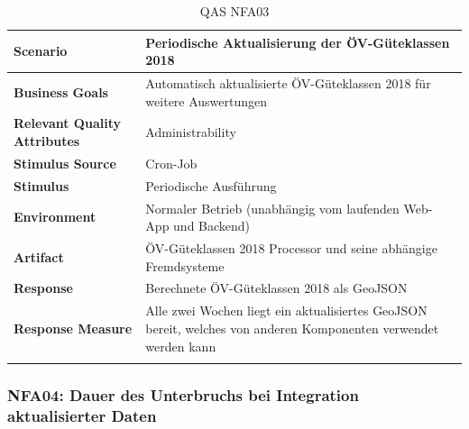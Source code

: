 \begin{longtable}{l p{10.6cm}}
        \toprule
        \textbf{Scenario}
                                & Periodische Aktualisierung der ÖV-Güteklassen 2018\\
        \midrule
        \textbf{Business Goals}
                                & Automatisch aktualisierte ÖV-Güteklassen 2018 für weitere Auswertungen\\
        \textbf{Relevant Quality Attributes}
                                & Administrability\\
        \textbf{Stimulus Source}
                                & Cron-Job\\
        \textbf{Stimulus}
                                & Periodische Ausführung \nameref{Use Cases:UC01} \\
        \textbf{Environment}
                                & Normaler Betrieb (unabhängig vom laufenden Web-App und Backend)\\
        \textbf{Artifact}
                                & ÖV-Güteklassen 2018 Processor und seine abhängige Fremdsysteme\\
        \textbf{Response}
                                & Berechnete ÖV-Güteklassen 2018 als GeoJSON\\  
        \textbf{Response Measure}
                                & Alle zwei Wochen liegt ein aktualisiertes GeoJSON bereit, welches von anderen Komponenten verwendet werden kann\\
        \bottomrule
    \caption{QAS NFA03}
    \label{table:nfa03}
\end{longtable}

\subsubsection{NFA04: Dauer des Unterbruchs bei Integration aktualisierter Daten}
\label{NFA:NFA04}


